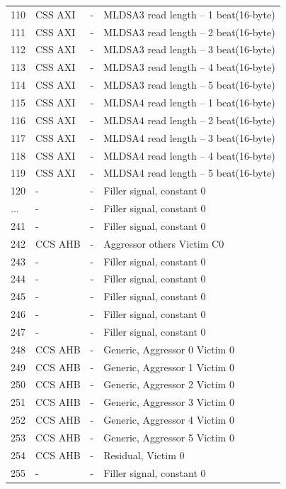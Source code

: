 \begin{center}
\begin{longtable}{|l|l|l|l|}
110 & CSS AXI &  -     &  MLDSA3 read  length -- 1 beat(16-byte)\\
111 & CSS AXI &  -     &  MLDSA3 read  length -- 2 beat(16-byte)\\
112 & CSS AXI &  -     &  MLDSA3 read  length -- 3 beat(16-byte)\\
113 & CSS AXI &  -     &  MLDSA3 read  length -- 4 beat(16-byte)\\
114 & CSS AXI &  -     &  MLDSA3 read  length -- 5 beat(16-byte)\\
115 & CSS AXI &  -     &  MLDSA4 read  length -- 1 beat(16-byte)\\
116 & CSS AXI &  -     &  MLDSA4 read  length -- 2 beat(16-byte)\\
117 & CSS AXI &  -     &  MLDSA4 read  length -- 3 beat(16-byte)\\
118 & CSS AXI &  -     &  MLDSA4 read  length -- 4 beat(16-byte)\\
119 & CSS AXI &  -     &  MLDSA4 read  length -- 5 beat(16-byte)\\
120 & - & - &   Filler signal, constant 0 \\
... & - & - &   Filler signal, constant 0 \\
241 & - & - &   Filler signal, constant 0 \\
242 & CCS AHB & - &   Aggressor others Victim C0 \\
243 & - & - &   Filler signal, constant 0 \\
244 & - & - &   Filler signal, constant 0 \\
245 & - & - &   Filler signal, constant 0 \\
246 & - & - &   Filler signal, constant 0 \\
247 & - & - &   Filler signal, constant 0 \\
248 & CCS AHB & - &   Generic, Aggressor 0 Victim 0\\
249 & CCS AHB & - &   Generic, Aggressor 1 Victim 0 \\
250 & CCS AHB & - &   Generic, Aggressor 2 Victim 0 \\
251 & CCS AHB & - &   Generic, Aggressor 3 Victim 0 \\
252 & CCS AHB & - &   Generic, Aggressor 4 Victim 0 \\
253 & CCS AHB & - &   Generic, Aggressor 5 Victim 0 \\
254 & CCS AHB & - &   Residual, Victim 0  \\
255 & - & - &   Filler signal, constant 0 \\
	\end{longtable}
\end{center}

